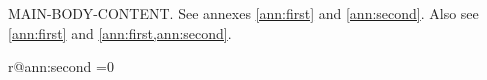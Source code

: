 \documentclass[PAC,annexes,glossaries]{P3CTeX}
\begin{document}
MAIN-BODY-CONTENT. See annexes \ref{ann:first} and \ref{ann:second}. Also see \cref{ann:first} and \cref{ann:first,ann:second}.
\ifnum{}\else\PackageError{annex-test}{Annex printed prematurely}{}\fi
\ifcsname r@ann:second\endcsname
  \ifnum{}=0\else
    \PackageError{annex-test}{Nested annex reused its parent's label}{}\fi
\fi
\end{document}
